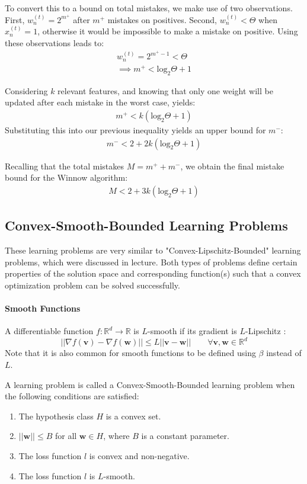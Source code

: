 \documentclass[11pt]{article}
\begin{document}
To convert this to a bound on total mistakes, we make use of two observations. First, $w_n^{(t)}=2^{m^+}$ after $m^+$ mistakes on positives. Second, $w_n^{(t)} < \Theta$ when $x_n^{(t)}=1$, otherwise it would be impossible to make a mistake on positive. Using these observations leads to:
\begin{align}
    w_n^{(t)} = 2^{m^+-1} < \Theta \\
    \implies m^+ < \text{log}_2\Theta + 1
\end{align}


Considering $k$ relevant features, and knowing that only one weight will be updated after each mistake in the worst case, yields:
\begin{align}
    m^+ < k(\text{log}_2 \Theta + 1)
\end{align}
Substituting this into our previous inequality yields an upper bound for $m^-$:
\begin{align}
    m^- < 2 + 2k(\text{log}_2\Theta + 1)
\end{align}

Recalling that the total mistakes $M= m^+ + m^-$, we obtain the final mistake bound for the Winnow algorithm:
\begin{align}
    M < 2 + 3k(\text{log}_2\Theta + 1)
\end{align}

\subsection{Convex-Smooth-Bounded Learning Problems}
These learning problems are very similar to "Convex-Lipschitz-Bounded" learning problems, which were discussed in lecture. Both types of problems define certain properties of the solution space and corresponding function(s) such that a convex optimization problem can be solved successfully.
\paragraph{Smooth Functions} A differentiable function $f : \mathbb{R}^d \rightarrow \mathbb{R}$ is $L$-smooth if its gradient is $L$-Lipschitz \cite{wu2019convex}:
\begin{equation}
    \label{eq:smooth_func}
    || \nabla f(\boldsymbol{v}) - \nabla f(\boldsymbol{w}) || \leq L || \boldsymbol{v} - \boldsymbol{w} || \quad \quad \forall \boldsymbol{v}, \boldsymbol{w} \in \mathbb{R}^d
\end{equation}
Note that it is also common for smooth functions to be defined using $\beta$ instead of $L$.

A learning problem is called a Convex-Smooth-Bounded learning problem when the following conditions \cite{wu2019convex} are satisfied:
\begin{enumerate}
    \item The hypothesis class $H$ is a convex set.
    \item $||\boldsymbol{w}|| \leq B$ for all $\boldsymbol{w} \in H$, where $B$ is a constant parameter.
    \item The loss function $l$ is convex and non-negative.
    \item The loss function $l$ is $L$-smooth.
\end{enumerate}
\end{document}
